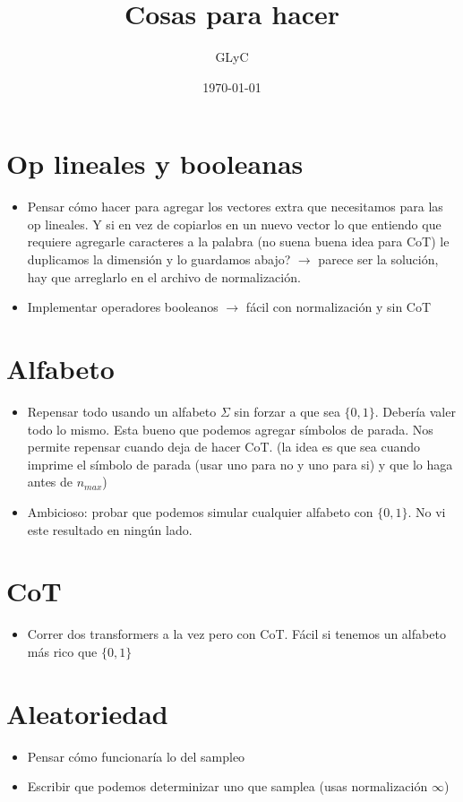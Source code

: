 \documentclass{article}
\title{Cosas para hacer}
\author{GLyC}
\date{\today}
\begin{document}
\maketitle

\section{Op lineales y booleanas}

\begin{itemize}
    \item Pensar cómo hacer para agregar los vectores extra que necesitamos para las op lineales. Y si en vez de copiarlos en un nuevo vector lo que entiendo que requiere agregarle caracteres a la palabra (no suena buena idea para CoT) le duplicamos la dimensión y lo guardamos abajo? $\rightarrow$ parece ser la solución, hay que arreglarlo en el archivo de normalización.
    \item Implementar operadores booleanos $\rightarrow$ fácil con normalización y sin CoT
\end{itemize}



\section{Alfabeto}

\begin{itemize}
    \item Repensar todo usando un alfabeto $\Sigma$ sin forzar a que sea $\{0,1\}$. Debería valer todo lo mismo. Esta bueno que podemos agregar símbolos de parada. Nos permite repensar cuando deja de hacer CoT. (la idea es que sea cuando imprime el símbolo de parada (usar uno para no y uno para si) y que lo haga antes de $n_{max}$)
    \item Ambicioso: probar que podemos simular cualquier alfabeto con $\{0,1\}$. No vi este resultado en ningún lado.
\end{itemize}



\section{CoT}

\begin{itemize}
    \item Correr dos transformers a la vez pero con CoT. Fácil si tenemos un alfabeto más rico que $\{0,1\}$
\end{itemize}



\section{Aleatoriedad}
\begin{itemize}
    \item Pensar cómo funcionaría lo del sampleo
    \item Escribir que podemos determinizar uno que samplea (usas normalización $\infty$)
\end{itemize}
\end{document}
